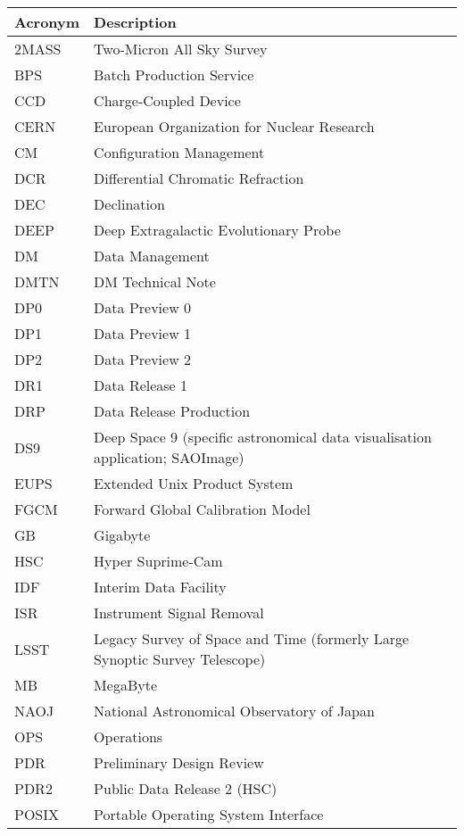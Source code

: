 \addtocounter{table}{-1}
\begin{longtable}{p{}p{}}\hline
\textbf{Acronym} & \textbf{Description}  \\\hline

2MASS & Two-Micron All Sky Survey \\\hline
BPS & Batch Production Service \\\hline
CCD & Charge-Coupled Device \\\hline
CERN & European Organization for Nuclear Research \\\hline
CM & Configuration Management \\\hline
DCR & Differential Chromatic Refraction \\\hline
DEC & Declination \\\hline
DEEP & Deep Extragalactic Evolutionary Probe \\\hline
DM & Data Management \\\hline
DMTN & DM Technical Note \\\hline
DP0 & Data Preview 0 \\\hline
DP1 & Data Preview 1 \\\hline
DP2 & Data Preview 2 \\\hline
DR1 & Data Release 1 \\\hline
DRP & Data Release Production \\\hline
DS9 & Deep Space 9 (specific astronomical data visualisation application; SAOImage) \\\hline
EUPS & Extended Unix Product System \\\hline
FGCM & Forward Global Calibration Model \\\hline
GB & Gigabyte \\\hline
HSC & Hyper Suprime-Cam \\\hline
IDF & Interim Data Facility \\\hline
ISR & Instrument Signal Removal \\\hline
LSST & Legacy Survey of Space and Time (formerly Large Synoptic Survey Telescope) \\\hline
MB & MegaByte \\\hline
NAOJ & National Astronomical Observatory of Japan \\\hline
OPS & Operations \\\hline
PDR & Preliminary Design Review \\\hline
PDR2 & Public Data Release 2 (HSC) \\\hline
POSIX & Portable Operating System Interface \\\hline

\end{longtable}
